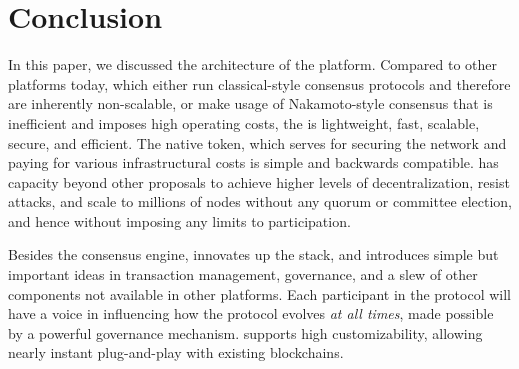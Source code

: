 \documentclass[runningheads]{llncs}
\begin{document}
\section{Conclusion}
\label{section:conclusion}
In this paper, we discussed the architecture of the \AVAPlatformName{} platform. Compared to other platforms today, which either run classical-style consensus protocols and therefore are inherently non-scalable, or make usage of Nakamoto-style consensus that is inefficient and imposes high operating costs, the \AVAPlatformName{} is lightweight, fast, scalable, secure, and efficient. The native token, which serves for securing the network and paying for various infrastructural costs is simple and backwards compatible. \AVATokenName{} has capacity beyond other proposals to achieve higher levels of decentralization, resist attacks, and scale to millions of nodes without any quorum or committee election, and hence without imposing any limits to participation. 

Besides the consensus engine, \AVAPlatformName{} innovates up the stack, and introduces simple but important ideas in transaction management, governance, and a slew of other components not available in other platforms. Each participant in the protocol will have a voice in influencing how the protocol evolves \emph{at all times}, made possible by a powerful governance mechanism. \AVAPlatformName{} supports high customizability, allowing nearly instant plug-and-play with existing blockchains. 



\end{document}
